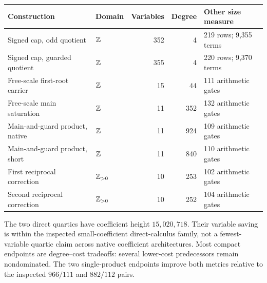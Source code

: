 \begin{abstract}
This packet develops explicit Diophantine consistency constructions across
several size criteria. A signed pooled Pell cap compresses the direct-calculus quartic
to $352$ unrestricted integer unknowns. A free-scale carrier lowers the
fifteen-integer degree to $44$. Main-root saturation combined with the
free-scale argument gives an eleven-integer polynomial of degree $352$.
Polynomial radical centering gives ten-positive-variable equations of
degrees $253$ and $252$. A separate single-product saturation reduces both
degree and cost at two low-operation eleven-integer endpoints.

The supplied ordinary proofs are reductions relative to pinned, retained
compiler and refutation calibrations. They do not prove consistency,
global optimality or a new end-to-end formal-kernel theorem. The accompanying
archive contains literal equations and DAGs, complete coefficient payloads,
proofs and independent reviews, source provenance, and offline normal and
optimized Python replay with corruption controls.
\end{abstract}
\begin{center}\small
\begin{tabular}{llrrl}
\toprule
Construction & Domain & Variables & Degree & Other size measure\\
\midrule
Signed cap, odd quotient & $\mathbb Z$ &352&4&219 rows; 9,355 terms\\
Signed cap, guarded quotient & $\mathbb Z$ &355&4&220 rows; 9,370 terms\\
Free-scale first-root carrier & $\mathbb Z$ &15&44&111 arithmetic gates\\
Free-scale main saturation & $\mathbb Z$ &11&352&132 arithmetic gates\\
Main-and-guard product, native & $\mathbb Z$ &11&924&109 arithmetic gates\\
Main-and-guard product, short & $\mathbb Z$ &11&840&110 arithmetic gates\\
First reciprocal correction & $\mathbb Z_{>0}$ &10&253&102 arithmetic gates\\
Second reciprocal correction & $\mathbb Z_{>0}$ &10&252&104 arithmetic gates\\
\bottomrule
\end{tabular}\end{center}
The two direct quartics have coefficient height $15{,}020{,}718$. Their variable
saving is within the inspected small-coefficient direct-calculus family,
not a fewest-variable quartic claim across native coefficient architectures.
Most compact endpoints are degree--cost tradeoffs: several lower-cost
predecessors remain nondominated. The two single-product endpoints improve
both metrics relative to the inspected $966/111$ and $882/112$ pairs.
